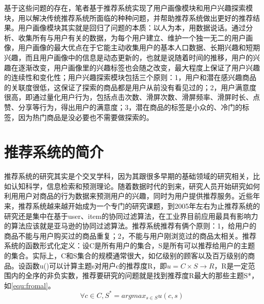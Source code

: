	基于这些问题的存在，笔者基于推荐系统实现了用户画像模块和用户兴趣探索模块，用以解决传统推荐系统所面临的种种问题，并帮助推荐系统做出更好的推荐结果。用户画像模块其实就是回归了问题的本质：以人为本，用数据说话。通过分析、收集所有与用户有关的数据，为每个用户建立、维护一个独一无二的用户画像，用户画像的最大优点在于它能主动收集用户的基本人口数据、长期兴趣和短期兴趣，而且用户画像中的信息是动态更新的，也就是说随着时间的推移，用户的兴趣在逐渐改变，用户画像里的兴趣标签也会随之改变，最大程度上保证了用户兴趣的连续性和变化性；用户兴趣探索模块包括三个原则：1，用户和潜在感兴趣商品的关联度很低，这保证了探索的商品都是用户从前没有看见过的；2，用户满意度很高，即通过量化用户行为，包括点击次数、滑屏次数、滑屏频率、滑屏时长、点赞、分享等行为，得出用户的满意度；3，潜在商品的标签是小众的、冷门的标签，因为热门商品是没必要也不需要做探索的。

\section{推荐系统的简介}
推荐系统的研究其实是个交叉学科，因为其跟很多早期的基础领域的研究相关，比如认知科学\citep{cognitive-science}，信息检索\citep{info-retrieval}和预测理论\citep{Forecast-principle}。随着数据时代的到来，研究人员开始研究如何利用用户对商品的行为数据来预测用户的兴趣，同时为用户提供推荐服务\citep{cf-sn}。近些年来，推荐系统越来越开始成为一个专门的研究课题，到2005年左右为止推荐系统的研究还是集中在基于user、item的协同过滤算法\citep{Wikipedia}，在工业界目前应用最具有影响力的算法应该就是亚马逊的协同过滤算法\citep{Amazon-cf}。推荐系统推荐有俩个原则：1，给用户的商品不能与用户购买过的商品重复；2，不能与用户刚浏览过的商品太相关。推荐系统的函数形式化定义：设C是所有用户的集合，S是所有可以推荐给用户的主题的集合。实际上，C和S集合的规模通常很大，如亿级别的顾客以及百万级别的商品。设函数u()可以计算主题s对用户c的推荐度R，即$u=C\times S \rightarrow R$，R是一定范围内的全序的非负实数，推荐要研究的问题就是找到推荐度R最大的那些主题S*，如\autoref{equ:fromal}。
\begin{equation}
\forall c \in C,S^{*}=arg  max_{s \in S} u(c,s)
\label{equ:fromal}
\end{equation}


